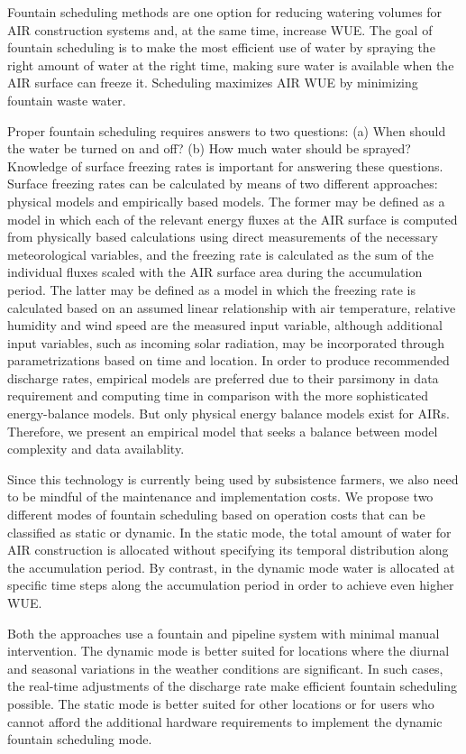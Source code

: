 \documentclass[utf8]{frontiersSCNS}
\begin{document}
Fountain scheduling methods are one option for reducing watering volumes for AIR construction systems and, at
the same time, increase WUE. The goal of fountain scheduling is to make the most efficient use of water by
spraying the right amount of water at the right time, making sure water is available when the AIR surface can
freeze it. Scheduling maximizes AIR WUE by minimizing fountain waste water.  

Proper fountain scheduling requires answers to two questions: (a) When should the water be turned on and off?
(b) How much water should be sprayed? Knowledge of surface freezing rates is important for answering these
questions. Surface freezing rates can be calculated by means of two different approaches: physical
models and empirically based models. The former may be defined as a model in which each of the relevant
energy fluxes at the AIR surface is computed from physically based calculations using direct measurements of the
necessary meteorological variables, and the freezing rate is calculated as the sum of the individual fluxes
scaled with the AIR surface area during the accumulation period. The latter may be defined as a model in which
the freezing rate is calculated based on an assumed linear relationship with air temperature, relative humidity
and wind speed are the measured input variable, although additional input variables, such as incoming solar
radiation, may be incorporated through parametrizations based on time and location. In order to produce
recommended discharge rates, empirical models are preferred due to their parsimony in data requirement and
computing time in comparison with the more sophisticated energy-balance models. But only physical energy balance
models exist for AIRs. Therefore, we present an empirical model that seeks a balance between model complexity
and data availablity.

Since this technology is currently being used by subsistence farmers, we also need to be mindful of the
maintenance and implementation costs. We propose two different modes of fountain scheduling based on operation
costs that can be classified as static or dynamic. In the static mode, the total amount of water
for AIR construction is allocated without specifying its temporal distribution along the accumulation period. By
contrast, in the dynamic mode water is allocated at specific time steps along the accumulation period in
order to achieve even higher WUE.

Both the approaches use a fountain and pipeline system with minimal manual intervention. The dynamic mode is
better suited for locations where the diurnal and seasonal variations in the weather conditions are significant.
In such cases, the real-time adjustments of the discharge rate make efficient fountain scheduling
possible. The static mode is better suited for other locations or for users who cannot afford the additional
hardware requirements to implement the dynamic fountain scheduling mode.
\end{document}
